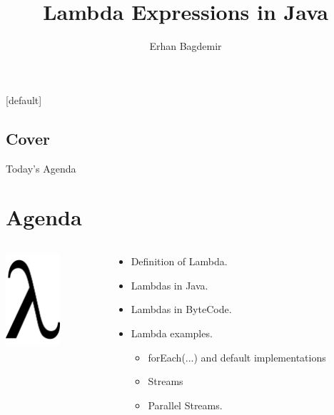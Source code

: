 \documentclass{beamer}
\author[Bagdemir]{Erhan Bagdemir}
\title{{\fontsize{2em}{1em}\selectfont Lambda Expressions in Java}}
\institute{bagdemir.com - Follow on @ebagdemir}
\begin{document}
	[default]
	
	\begin{frame}
		\titlepage
		\section{Cover}
	\end{frame}

	\begin{frame}{Today's Agenda}
		\section{Agenda}
		\begin{columns}
    			\begin{column}{0.3\textwidth}
					\centering
					\includegraphics[width=2cm]{lambda}	
    			\end{column}
    			\begin{column}{0.7\textwidth}
        				\begin{itemize}
        					\item Definition of Lambda.
        					\item Lambdas in Java.
        					\item Lambdas in ByteCode.
        					\item Lambda examples.
					
							\begin{itemize}
								\item forEach(...) and default implementations
								\item Streams
    	    					\item Parallel Streams.
        					\end{itemize}
					
        				\end{itemize}
    		
    			\end{column}
		\end{columns}
	\end{frame}
	
\end{document}
